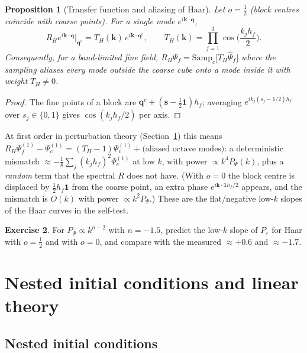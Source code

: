 \documentclass[11pt]{article}
\newtheorem{proposition}{Proposition}[section]
\theoremstyle{definition}
\newtheorem{exercise}[proposition]{Exercise}
\newcommand{\q}{\mathbf{q}}
\newcommand{\kk}{\mathbf{k}}
\newcommand{\Psif}{\Psi_{f}}
\begin{document}
\begin{proposition}[Transfer function and aliasing of Haar]\label{prop:haar}
Let $o=\tfrac12$ (block centres coincide with coarse points). For a single mode $e^{i\kk\cdot\q}$,
\begin{equation}
R_H e^{i\kk\cdot\q}\big|_{\q^c}=T_H(\kk)\,e^{i\kk\cdot\q^c},\qquad T_H(\kk)=\prod_{j=1}^3\cos\!\Big(\frac{k_jh_f}{2}\Big).
\end{equation}
Consequently, for a band-limited fine field, $R_H\Psif=\mathrm{Samp}_c\big[T_H\hat\Psif\big]$ where the sampling aliases every mode outside the coarse cube onto a mode inside it with weight $T_H\neq0$.
\end{proposition}
\begin{proof}
The fine points of a block are $\q^c+(\mathbf s-\tfrac12\mathbf 1)h_f$; averaging $e^{ik_j(s_j-1/2)h_f}$ over $s_j\in\{0,1\}$ gives $\cos(k_jh_f/2)$ per axis.
\end{proof}

At first order in perturbation theory (Section~\ref{sec:linear}) this means $R_H\Psi^{(1)}_f-\Psi^{(1)}_c=(T_H-1)\Psi^{(1)}_c+\text{(aliased octave modes)}$: a deterministic mismatch $\approx-\tfrac18\sum_j(k_jh_f)^2\Psi_c^{(1)}$ at low $k$, with power $\propto k^4P_{\Psi}(k)$, plus a \emph{random} term that the spectral $R$ does not have. (With $o=0$ the block centre is displaced by $\tfrac12h_f\mathbf 1$ from the coarse point, an extra phase $e^{i\kk\cdot\mathbf 1h_f/2}$ appears, and the mismatch is $O(k)$ with power $\propto k^2P_\Psi$.) These are the flat/negative low-$k$ slopes of the Haar curves in the self-test.

\begin{exercise}
For $P_\Psi\propto k^{n-2}$ with $n=-1.5$, predict the low-$k$ slope of $P_\varepsilon$ for Haar with $o=\tfrac12$ and with $o=0$, and compare with the measured $\approx+0.6$ and $\approx-1.7$.
\end{exercise}

\section{Nested initial conditions and linear theory}\label{sec:linear}

\subsection{Nested initial conditions}
\end{document}
